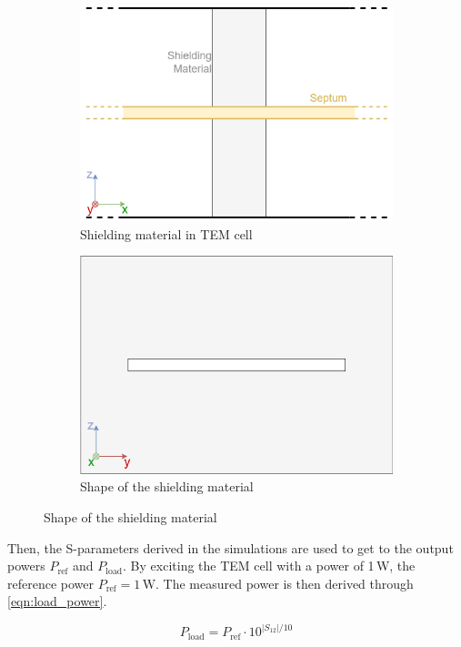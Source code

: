 \begin{figure}[h]
    \centering
    \begin{subfigure}[h]{0.49\textwidth}
        \centering
        \includegraphics[width=\textwidth]{Documentation//content//10_theory//img/ASTM ES7-83.png}
        \caption{Shielding material in TEM cell}
        \label{fig:ASTM ES7-83}
    \end{subfigure}%
    \hfill
    \begin{subfigure}[h]{0.49\textwidth}
        \centering
        \includegraphics[width=\textwidth]{Documentation//content//10_theory/img/form_of_shielding_material.png}
        \caption{Shape of the shielding material}
        \label{fig:form_of_shielding_material}
    \end{subfigure}
    \label{fig:subfigures}
\end{figure}

Then, the S-parameters derived in the simulations are used to get to the output powers $P_\mathrm{ref}$ and $P_\mathrm{load}$. By exciting the TEM cell with a power of 1\,W, the reference power $P_\mathrm{ref}=1\,\mathrm{W}$. The measured power is then derived through \autoref{eqn:load_power}.

\begin{equation}
    P_\mathrm{load}=P_\mathrm{ref}\cdot10^{|S_\mathrm{12}|/10}
    \label{eqn:load_power}
\end{equation}


